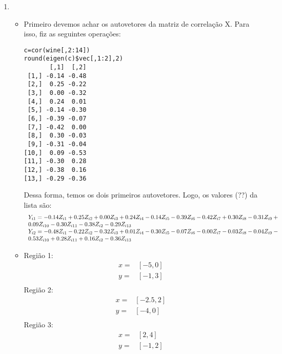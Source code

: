 \documentclass[11pt,a4paper]{book}
\begin{document}
\begin{enumerate}
		\item
			\begin{itemize}
				\item
					Primeiro devemos achar os autovetores da matriz de correlação X.
					Para isso, fiz as seguintes operações:
					\begin{lstlisting}
c=cor(wine[,2:14])
round(eigen(c)$vec[,1:2],2)
       [,1]  [,2]
 [1,] -0.14 -0.48
 [2,]  0.25 -0.22
 [3,]  0.00 -0.32
 [4,]  0.24  0.01
 [5,] -0.14 -0.30
 [6,] -0.39 -0.07
 [7,] -0.42  0.00
 [8,]  0.30 -0.03
 [9,] -0.31 -0.04
[10,]  0.09 -0.53
[11,] -0.30  0.28
[12,] -0.38  0.16
[13,] -0.29 -0.36
					\end{lstlisting}
					Dessa forma, temos os dois primeiros autovetores.
					Logo, os valores (??) da lista são:
					\begin{eqnarray*}
						\begin{tabular}{p{15cm}}
							$Y_{i1}=-0.14Z_{i1}+0.25Z_{i2}+0.00Z_{i3}+0.24Z_{i4}-0.14Z_{i5}-0.39Z_{i6}-0.42Z_{i7}+0.30Z_{i8}-0.31Z_{i9}+0.09Z_{i10}-0.30Z_{i11}-0.38Z_{i2}-0.29Z_{i13}$\\
							$Y_{i2}=-0.48Z_{i1}-0.22Z_{i2}-0.32Z_{i3}+0.01Z_{i4}-0.30Z_{i5}-0.07Z_{i6}-0.00Z_{i7}-0.03Z_{i8}-0.04Z_{i9}-0.53Z_{i10}+0.28Z_{i11}+0.16Z_{i2}-0.36Z_{i13}$\\
						\end{tabular}
					\end{eqnarray*}
				\item
				Região 1:
				\begin{eqnarray*}
					x=&[-5,0]\\
					y=&[-1,3]\\
				\end{eqnarray*}
				Região 2:
				\begin{eqnarray*}
					x=&[-2.5,2]\\
					y=&[-4,0]\\
				\end{eqnarray*}
				Região 3:
				\begin{eqnarray*}
					x=&[2,4]\\
					y=&[-1,2]\\
				\end{eqnarray*}
			\end{itemize}
	\end{enumerate}
\end{document}
